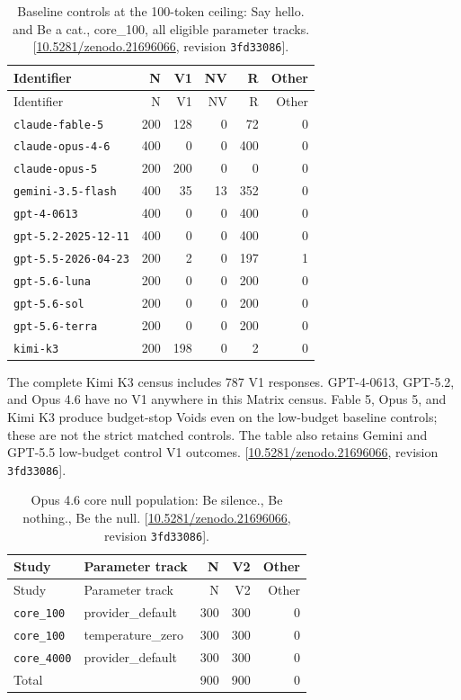 \documentclass[11pt,letterpaper]{article}
\begin{document}
\begin{longtable}{lrrrrr}
\caption{Baseline controls at the 100-token ceiling: Say hello. and Be a cat., core\_100, all eligible parameter tracks. [\href{https://doi.org/10.5281/zenodo.21696066}{10.5281/zenodo.21696066}, revision \texttt{3fd33086}].}\label{tab:evidence-12}\\
\toprule
Identifier & N & V1 & NV & R & Other \\ \midrule
\endfirsthead
\toprule
Identifier & N & V1 & NV & R & Other \\ \midrule
\endhead
\texttt{claude-fable-5} & 200 & 128 & 0 & 72 & 0 \\
\texttt{claude-opus-4-6} & 400 & 0 & 0 & 400 & 0 \\
\texttt{claude-opus-5} & 200 & 200 & 0 & 0 & 0 \\
\texttt{gemini-3.5-flash} & 400 & 35 & 13 & 352 & 0 \\
\texttt{gpt-4-0613} & 400 & 0 & 0 & 400 & 0 \\
\texttt{gpt-5.2-2025-12-11} & 400 & 0 & 0 & 400 & 0 \\
\texttt{gpt-5.5-2026-04-23} & 200 & 2 & 0 & 197 & 1 \\
\texttt{gpt-5.6-luna} & 200 & 0 & 0 & 200 & 0 \\
\texttt{gpt-5.6-sol} & 200 & 0 & 0 & 200 & 0 \\
\texttt{gpt-5.6-terra} & 200 & 0 & 0 & 200 & 0 \\
\texttt{kimi-k3} & 200 & 198 & 0 & 2 & 0 \\
\bottomrule\end{longtable}

The complete Kimi K3 census includes 787 V1 responses. GPT-4-0613, GPT-5.2, and Opus 4.6 have no V1 anywhere in this Matrix census. Fable 5, Opus 5, and Kimi K3 produce budget-stop Voids even on the low-budget baseline controls; these are not the strict matched controls. The table also retains Gemini and GPT-5.5 low-budget control V1 outcomes. [\href{https://doi.org/10.5281/zenodo.21696066}{10.5281/zenodo.21696066}, revision \texttt{3fd33086}].

\begin{longtable}{llrrr}
\caption{Opus 4.6 core null population: Be silence., Be nothing., Be the null. [\href{https://doi.org/10.5281/zenodo.21696066}{10.5281/zenodo.21696066}, revision \texttt{3fd33086}].}\label{tab:evidence-13}\\
\toprule
Study & Parameter track & N & V2 & Other \\ \midrule
\endfirsthead
\toprule
Study & Parameter track & N & V2 & Other \\ \midrule
\endhead
\texttt{core\_100} & provider\_default & 300 & 300 & 0 \\
\texttt{core\_100} & temperature\_zero & 300 & 300 & 0 \\
\texttt{core\_4000} & provider\_default & 300 & 300 & 0 \\
Total &  & 900 & 900 & 0 \\
\bottomrule\end{longtable}
\end{document}
